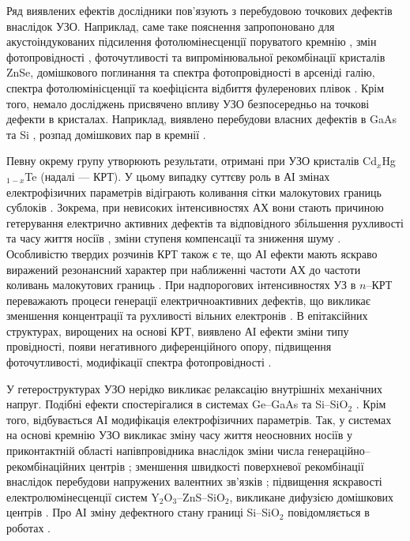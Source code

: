 Ряд виявлених ефектів дослідники пов'язують з перебудовою точкових дефектів внаслідок УЗО.
Наприклад, саме таке пояснення запропоновано для акустоіндукованих
підсилення фотолюмінесценції поруватого кремнію \cite{Bahar2003},
змін фотопровідності \cite{US:ZnSe},  фоточутливості та випромінювальної рекомбінації  \cite{ZobovFTP2008} кристалів ZnSe,
домішкового поглинання \cite{Zaver2007} та спектра фотопровідності \cite{UST:GaAs2015} в арсеніді галію,
спектра фотолюмінісценції та коефіцієнта відбиття фулеренових плівок \cite{RITTER2008}.
Крім того, немало досліджень присвячено впливу УЗО безпосередньо на точкові дефекти в кристалах.
Наприклад, виявлено перебудови  власних дефектів в GaAs \cite{Wosinski,Ostapenko1994,buyanova1994} та Si \cite{UST:Onanko},
розпад домішкових пар в кремнії \cite{Ostapenko1995SST,Ostapenko1995,Ostapenko1994APL}.


Певну окрему групу утворюють результати, отримані при УЗО кристалів Cd$_x$Hg$_{1-x}$Te (надалі --- КРТ).
У цьому випадку суттєву роль в АІ змінах електрофізичних параметрів відіграють коливання сітки малокутових границь сублоків \cite{KRT:FTT89,KRT:FTT90}.
Зокрема, при невисоких інтенсивностях АХ вони стають причиною гетерування електрично активних дефектів та відповідного збільшення рухливості та часу життя носіїв \cite{KRT:FTP90,Savkina:SPQEO2006}, зміни ступеня компенсації та зниження шуму \cite{Ol_Shav}.
Особливістю твердих розчинів КРТ також є те, що АІ ефекти мають яскраво виражений резонансний характер при наближенні частоти АХ до частоти коливань малокутових границь \cite{KRT:FTP90,KRT:FTT89,KRT:FTT90,Ol_Shav}.
При надпорогових інтенсивностях УЗ в $n$--КРТ переважають процеси генерації електричноактивних дефектів, що викликає зменшення концентрації та рухливості  вільних електронів \cite{KRT:FTP90,KRT:FTT89}.
В епітаксійних структурах, вирощених на основі КРТ,  виявлено АІ ефекти зміни типу провідності, появи негативного диференційного опору, підвищення фоточутливості, модифікації спектра фотопровідності \cite{Savkina:SST07,SavkinaPSSB2002}.


У гетероструктурах УЗО нерідко викликає релаксацію внутрішніх механічних напруг.
Подібні ефекти спостерігалися в системах Ge--GaAs \cite{BritunFTT,UST:GeGaAs1990} та Si--SiO$_2$ \cite{Zdeb1989}.
Крім того, відбувається АІ модифікація електрофізичних параметрів.
Так, у системах  на основі кремнію УЗО викликає зміну часу життя неосновних носіїв у приконтактній області напівпровідника
внаслідок зміни числа генераційно--рекомбінаційних центрів \cite{Parchinskii2003r,Zdeb1989};
зменшення швидкості поверхневої рекомбінації внаслідок перебудови напружених валентних зв'язків \cite{Vlasov2009r,Parchinskii2003r};
підвищення яскравості електролюмінесценції систем Y$_2$O$_3$--ZnS--SiO$_2$, викликане дифузією домішкових центрів \cite{UST:ZnS}.
Про АІ зміну дефектного стану границі Si--SiO$_2$ повідомляється в роботах \cite{Ostap:SiO2,UST:Medvid}.


